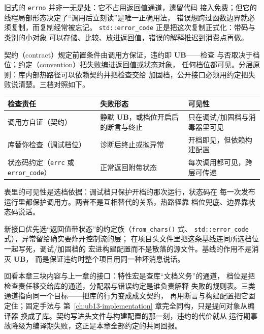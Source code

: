 \documentclass[12pt,a4paper,fontset=fandol]{ctexbook}
\newcommand{\Fn}[1]{\texttt{#1()}}
\newcommand{\Tp}[1]{\texttt{#1}}
\newcommand{\Bk}{\discretionary{}{}{}}
\newcommand{\UB}{\textbf{\textsf{UB}}}
\newcommand{\Feat}[1]{\texttt{#1}}
\begin{document}
旧式的 \Feat{errno} 并非一无是处：它不占用返回值通道，遗留代码
接入免费；但它的线程局部形态决定了“调用后立刻读”是唯一正确用法，
错误想跨过函数边界就必须复制，而复制经常被忘记。
\Tp{std::error\_code} 正是把这次复制正式化：带码与类别的小对象
可以存储、比较、放进返回值，错误的解释推迟到消费点再做。

\begin{compare}[title=契约与约定：谁检查、谁解释失败]
契约（contract）规定前置条件由调用方保证，违约即 \UB{}——检查
与否取决于档位；约定（convention）把失败编进返回值或状态对象，
任何档位都可见。分层原则：库内部热路径可以依赖契约并把检查交给
加固档，公开接口必须用约定把失败说清楚。三档对照如下。
\end{compare}

\begin{center}
\begin{tabular}{@{}>{\raggedright\arraybackslash}p{} >{\raggedright\arraybackslash}p{} >{\raggedright\arraybackslash}p{}@{}}
\toprule
检查责任 & 失败形态 & 可见性 \\
\midrule
调用方自证（契约） & 静默 \UB{}，或档位开启后的断言与终止 &
只在调试/加固档与消毒器里可见 \\
库替你检查（调试档位） & 诊断后终止或抛异常 &
开档即见，但依赖构建配置 \\
状态码约定（\Tp{errc} 或 \Tp{error{\Bk}\_code}） & 正常返回附带状态 &
每次调用都可见，跨层可传递 \\
\bottomrule
\end{tabular}
\end{center}

表里的可见性是选档依据：调试档只保护开档的那次运行，状态码在
每一次发布运行里都保护调用方。两者不是互相替代的关系，热路径靠
档位兜底、边界靠状态码说话。

\begin{bestpractice}[title=给项目定一条错误处理基线]
新接口优先选“返回值带状态”的约定族（\Fn{from\_chars} 式、
\Tp{std::error\_code} 式），异常留给确实要炸开控制流的层；
在项目头文件里把这条基线连同所选档位一起写死，调试/加固档的
宏进构建配置而不是散落的源文件。基线的作用不是消灭 \UB{}，
而是保证违约时整个项目用同一种坏消息说话。
\end{bestpractice}

回看本章三块内容与上一章的接口：特性宏是查库“文档义务”的通道，
档位是把检查责任移交给库的通道，分配器与错误约定是谁负责解释
失败的规则表。三类通道指向同一个目标——把库的行为变成成文契约，
再用断言与构建配置把它固定住；固定手法与
第~\ref{ch:ub13-implementation} 章完全同构，只是提问对象从编译器
换成了库。契约写进头文件与构建配置的那一刻，违约的代价就从
运行期事故降级为编译期失败，这正是本章全部约定的共同回报。
\end{document}
